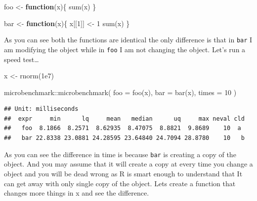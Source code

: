 \documentclass[
]{book}
\newenvironment{Shaded}{\begin{snugshade}}{\end{snugshade}}
\newcommand{\AttributeTok}[1]{\textcolor[rgb]{0.77,0.63,0.00}{#1}}
\newcommand{\ControlFlowTok}[1]{\textcolor[rgb]{0.13,0.29,0.53}{\textbf{#1}}}
\newcommand{\DecValTok}[1]{\textcolor[rgb]{0.00,0.00,0.81}{#1}}
\newcommand{\FloatTok}[1]{\textcolor[rgb]{0.00,0.00,0.81}{#1}}
\newcommand{\FunctionTok}[1]{\textcolor[rgb]{0.00,0.00,0.00}{#1}}
\newcommand{\NormalTok}[1]{#1}
\newcommand{\OtherTok}[1]{\textcolor[rgb]{0.56,0.35,0.01}{#1}}
\newcommand{\SpecialCharTok}[1]{\textcolor[rgb]{0.00,0.00,0.00}{#1}}
\begin{document}
\begin{Shaded}
\begin{Highlighting}[]
\NormalTok{foo }\OtherTok{\textless{}{-}} \ControlFlowTok{function}\NormalTok{(x)\{}
  \FunctionTok{sum}\NormalTok{(x)}
\NormalTok{\}}

\NormalTok{bar }\OtherTok{\textless{}{-}} \ControlFlowTok{function}\NormalTok{(x)\{}
\NormalTok{  x[[}\DecValTok{1}\NormalTok{]] }\OtherTok{\textless{}{-}} \DecValTok{1}
  \FunctionTok{sum}\NormalTok{(x)}
\NormalTok{\}}
\end{Highlighting}
\end{Shaded}

As you can see both the functions are identical the only difference is that in \texttt{bar} I am modifying the object while in \texttt{foo} I am not changing the object. Let's run a speed test\ldots{}

\begin{Shaded}
\begin{Highlighting}[]
\NormalTok{x }\OtherTok{\textless{}{-}} \FunctionTok{rnorm}\NormalTok{(}\FloatTok{1e7}\NormalTok{)}

\NormalTok{microbenchmark}\SpecialCharTok{::}\FunctionTok{microbenchmark}\NormalTok{(}
  \AttributeTok{foo =} \FunctionTok{foo}\NormalTok{(x),}
  \AttributeTok{bar =} \FunctionTok{bar}\NormalTok{(x),}
  \AttributeTok{times =} \DecValTok{10}
\NormalTok{)}
\end{Highlighting}
\end{Shaded}

\begin{verbatim}
## Unit: milliseconds
##  expr     min      lq     mean   median      uq     max neval cld
##   foo  8.1866  8.2571  8.62935  8.47075  8.8821  9.8689    10  a 
##   bar 22.8338 23.0881 24.28595 23.64840 24.7094 28.8780    10   b
\end{verbatim}

As you can see the difference in time is because \texttt{bar} is creating a copy of the object. And you may assume that it will create a copy at every time you change a object and you will be dead wrong as R is smart enough to understand that It can get away with only single copy of the object. Lets create a function that changes more things in x and see the difference.
\end{document}
